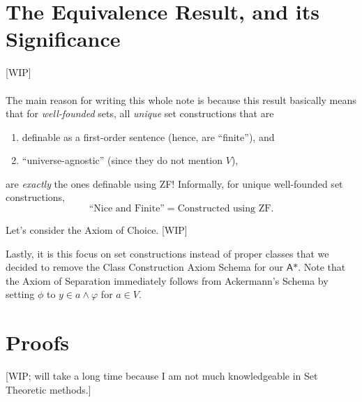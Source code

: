 \documentclass{article}
\begin{document}
\section{The Equivalence Result, and its Significance}
[WIP] \cite{levy} \cite{reinhardt}
\\\\
\noindent The main reason for writing this whole note is because this result basically means that for \textit{well-founded} sets, all \textit{unique} set constructions that are
\begin{enumerate}
	\item definable as a first-order sentence (hence, are ``finite''), and
	\item ``universe-agnostic'' (since they do not mention $V$),
\end{enumerate}
are \textit{exactly} the ones definable using ZF! Informally, for unique well-founded set constructions, $$\text{``Nice and Finite''} = \text{Constructed using ZF}.$$

Let's consider the Axiom of Choice. [WIP]

Lastly, it is this focus on set constructions instead of proper classes that we decided to remove the Class Construction Axiom Schema for our $\textsf{A*}$. Note that the Axiom of Separation immediately follows from Ackermann's Schema by setting $\phi$ to $y \in a \wedge \varphi$ for $a\in V$.

\section{Proofs}
[WIP; will take a long time because I am not much knowledgeable in Set Theoretic methods.]



\end{document}
